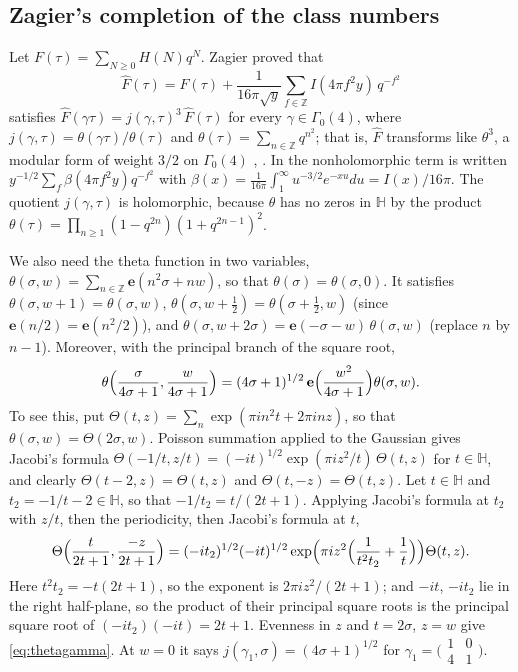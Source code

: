 \documentclass[11pt]{amsart}
\theoremstyle{definition}
\newcommand{\ZZ}{\mathbb{Z}}
\newcommand{\HH}{\mathbb{H}}
\newcommand{\e}{\mathbf{e}}
\begin{document}
\subsection{Zagier's completion of the class numbers}
Let $F(\tau)=\sum_{N\ge0}H(N)q^N$. Zagier proved that
\begin{equation}\label{eq:zagier}
\widehat F(\tau)=F(\tau)+\frac{1}{16\pi\sqrt y}\sum_{f\in\ZZ}I(4\pi f^2y)\,q^{-f^2}
\end{equation}
satisfies $\widehat F(\gamma\tau)=j(\gamma,\tau)^3\,\widehat F(\tau)$ for every $\gamma\in\Gamma_0(4)$, where $j(\gamma,\tau)=\theta(\gamma\tau)/\theta(\tau)$ and $\theta(\tau)=\sum_{n\in\ZZ}q^{n^2}$; that is, $\widehat F$ transforms like $\theta^3$, a modular form of weight $3/2$ on $\Gamma_0(4)$ \cite{Zag75}, \cite[Ch.~2, Thm.~2]{HZ76}. In \cite{HZ76} the nonholomorphic term is written $y^{-1/2}\sum_f\beta(4\pi f^2y)q^{-f^2}$ with $\beta(x)=\frac1{16\pi}\int_1^\infty u^{-3/2}e^{-xu}du=I(x)/16\pi$. The quotient $j(\gamma,\tau)$ is holomorphic, because $\theta$ has no zeros in $\HH$ by the product $\theta(\tau)=\prod_{n\ge1}(1-q^{2n})(1+q^{2n-1})^2$.

We also need the theta function in two variables, $\theta(\sigma,w)=\sum_{n\in\ZZ}\e(n^2\sigma+nw)$, so that $\theta(\sigma)=\theta(\sigma,0)$. It satisfies $\theta(\sigma,w+1)=\theta(\sigma,w)$, $\theta(\sigma,w+\frac12)=\theta(\sigma+\frac12,w)$ (since $\e(n/2)=\e(n^2/2)$), and $\theta(\sigma,w+2\sigma)=\e(-\sigma-w)\,\theta(\sigma,w)$ (replace $n$ by $n-1$). Moreover, with the principal branch of the square root,
\begin{equation}\label{eq:thetagamma}
\theta\Bigl(\frac{\sigma}{4\sigma+1},\frac{w}{4\sigma+1}\Bigr)=(4\sigma+1)^{1/2}\,\e\Bigl(\frac{w^2}{4\sigma+1}\Bigr)\theta(\sigma,w).
\end{equation}
To see this, put $\Theta(t,z)=\sum_n\exp(\pi in^2t+2\pi inz)$, so that $\theta(\sigma,w)=\Theta(2\sigma,w)$. Poisson summation applied to the Gaussian gives Jacobi's formula $\Theta(-1/t,z/t)=(-it)^{1/2}\exp(\pi iz^2/t)\,\Theta(t,z)$ for $t\in\HH$, and clearly $\Theta(t-2,z)=\Theta(t,z)$ and $\Theta(t,-z)=\Theta(t,z)$. Let $t\in\HH$ and $t_2=-1/t-2\in\HH$, so that $-1/t_2=t/(2t+1)$. Applying Jacobi's formula at $t_2$ with $z/t$, then the periodicity, then Jacobi's formula at $t$,
\[
\Theta\Bigl(\frac t{2t+1},\frac{-z}{2t+1}\Bigr)=(-it_2)^{1/2}(-it)^{1/2}\exp\Bigl(\pi iz^2\Bigl(\frac1{t^2t_2}+\frac1t\Bigr)\Bigr)\Theta(t,z).
\]
Here $t^2t_2=-t(2t+1)$, so the exponent is $2\pi iz^2/(2t+1)$; and $-it$, $-it_2$ lie in the right half-plane, so the product of their principal square roots is the principal square root of $(-it_2)(-it)=2t+1$. Evenness in $z$ and $t=2\sigma$, $z=w$ give \eqref{eq:thetagamma}. At $w=0$ it says $j(\gamma_1,\sigma)=(4\sigma+1)^{1/2}$ for $\gamma_1=\bigl(\begin{smallmatrix}1&0\\4&1\end{smallmatrix}\bigr)$.
\end{document}
